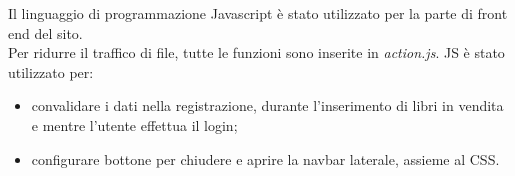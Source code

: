 Il linguaggio di programmazione Javascript è stato utilizzato per la parte di front end del sito.\\
Per ridurre il traffico di file, tutte le funzioni sono inserite in \textit{action.js}.
JS è stato utilizzato per:
\begin{itemize}
    \item convalidare i dati nella registrazione, durante l'inserimento di libri in vendita e mentre l'utente effettua il login;
    \item configurare bottone per chiudere e aprire la navbar laterale, assieme al CSS. 
\end{itemize}